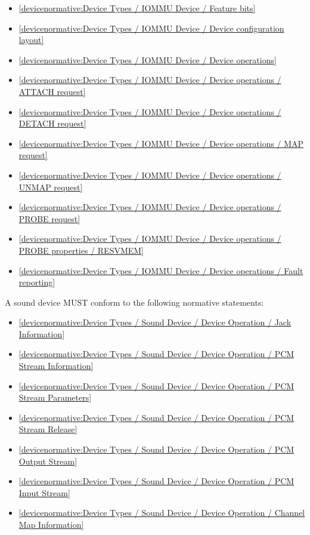 \begin{itemize}
\item \ref{devicenormative:Device Types / IOMMU Device / Feature bits}
\item \ref{devicenormative:Device Types / IOMMU Device / Device configuration layout}
\item \ref{devicenormative:Device Types / IOMMU Device / Device operations}
\item \ref{devicenormative:Device Types / IOMMU Device / Device operations / ATTACH request}
\item \ref{devicenormative:Device Types / IOMMU Device / Device operations / DETACH request}
\item \ref{devicenormative:Device Types / IOMMU Device / Device operations / MAP request}
\item \ref{devicenormative:Device Types / IOMMU Device / Device operations / UNMAP request}
\item \ref{devicenormative:Device Types / IOMMU Device / Device operations / PROBE request}
\item \ref{devicenormative:Device Types / IOMMU Device / Device operations / PROBE properties / RESVMEM}
\item \ref{devicenormative:Device Types / IOMMU Device / Device operations / Fault reporting}
\end{itemize}

\label{sec:Conformance / Device Conformance / Sound Device Conformance}

A sound device MUST conform to the following normative statements:

\begin{itemize}
\item \ref{devicenormative:Device Types / Sound Device / Device Operation / Jack Information}
\item \ref{devicenormative:Device Types / Sound Device / Device Operation / PCM Stream Information}
\item \ref{devicenormative:Device Types / Sound Device / Device Operation / PCM Stream Parameters}
\item \ref{devicenormative:Device Types / Sound Device / Device Operation / PCM Stream Release}
\item \ref{devicenormative:Device Types / Sound Device / Device Operation / PCM Output Stream}
\item \ref{devicenormative:Device Types / Sound Device / Device Operation / PCM Input Stream}
\item \ref{devicenormative:Device Types / Sound Device / Device Operation / Channel Map Information}
\end{itemize}

